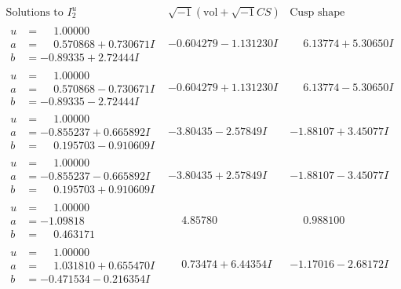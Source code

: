 \documentclass[1p]{elsarticle_modified}
\theoremstyle{definition}
\newcommand{\I}{\sqrt{-1}}
\begin{document}
$$\begin{array}{c|c|c}  
\text{Solutions to }I^u_{2}& \I (\text{vol} + \sqrt{-1}CS) & \text{Cusp shape}\\
 \hline 
\begin{aligned}
u &= \phantom{-}1.00000\phantom{ +0.000000I} \\
a &= \phantom{-}0.570868 + 0.730671 I \\
b &= -0.89335 + 2.72444 I\end{aligned}
 & -0.604279 - 1.131230 I & \phantom{-}6.13774 + 5.30650 I \\ \hline\begin{aligned}
u &= \phantom{-}1.00000\phantom{ +0.000000I} \\
a &= \phantom{-}0.570868 - 0.730671 I \\
b &= -0.89335 - 2.72444 I\end{aligned}
 & -0.604279 + 1.131230 I & \phantom{-}6.13774 - 5.30650 I \\ \hline\begin{aligned}
u &= \phantom{-}1.00000\phantom{ +0.000000I} \\
a &= -0.855237 + 0.665892 I \\
b &= \phantom{-}0.195703 - 0.910609 I\end{aligned}
 & -3.80435 - 2.57849 I & -1.88107 + 3.45077 I \\ \hline\begin{aligned}
u &= \phantom{-}1.00000\phantom{ +0.000000I} \\
a &= -0.855237 - 0.665892 I \\
b &= \phantom{-}0.195703 + 0.910609 I\end{aligned}
 & -3.80435 + 2.57849 I & -1.88107 - 3.45077 I \\ \hline\begin{aligned}
u &= \phantom{-}1.00000\phantom{ +0.000000I} \\
a &= -1.09818\phantom{ +0.000000I} \\
b &= \phantom{-}0.463171\phantom{ +0.000000I}\end{aligned}
 & \phantom{-}4.85780\phantom{ +0.000000I} & \phantom{-}0.988100\phantom{ +0.000000I} \\ \hline\begin{aligned}
u &= \phantom{-}1.00000\phantom{ +0.000000I} \\
a &= \phantom{-}1.031810 + 0.655470 I \\
b &= -0.471534 - 0.216354 I\end{aligned}
 & \phantom{-}0.73474 + 6.44354 I & -1.17016 - 2.68172 I \\ \hline\begin{aligned}

\end{aligned}
\end{array}$$
\end{document}

